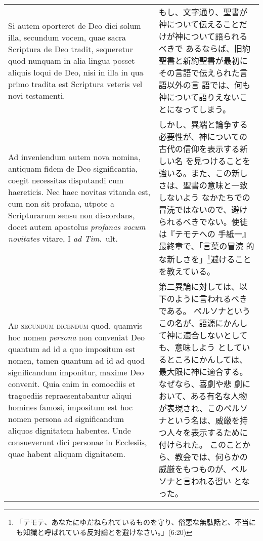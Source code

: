 \documentclass[10pt]{jsarticle} %
\begin{document}
\begin{longtable}{p{21em}p{21em}}
\\


Si
autem oporteret de Deo dici solum illa, secundum vocem, quae sacra
Scriptura de Deo tradit, sequeretur quod nunquam in alia lingua posset
aliquis loqui de Deo, nisi in illa in qua primo tradita est Scriptura
veteris vel novi testamenti. 

&

もし、文字通り、聖書が神について伝えることだけが神について語られるべきで
 あるならば、旧約聖書と新約聖書が最初にその言語で伝えられた言語以外の言
 語では、何も神について語りえないことになってしまう。



\\


Ad inveniendum autem nova nomina, antiquam
fidem de Deo significantia, coegit necessitas disputandi cum
haereticis. Nec haec novitas vitanda est, cum non sit profana, utpote a
Scripturarum sensu non discordans, docet autem apostolus {\itshape profanas vocum
novitates} vitare, I {\itshape ad Tim}.~ult.


&

しかし、異端と論争する必要性が、神についての古代の信仰を表示する新しい名
 を見つけることを強いる。また、この新しさは、聖書の意味と一致しないよう
 なかたちでの冒涜ではないので、避けられるべきでない。使徒は『テモテへの
 手紙一』最終章で、「言葉の冒涜
 的な新しさを」\footnote{「テモテ、あなたにゆだねられているものを守り、俗悪な無駄話と、不当にも知識と呼ばれている反対論とを避けなさい。」(6:20)}避けることを教えている。



\\



{\scshape Ad secundum dicendum} quod, quamvis hoc nomen {\itshape persona} non conveniat Deo
quantum ad id a quo impositum est nomen, tamen quantum ad id ad quod
significandum imponitur, maxime Deo convenit. Quia enim in comoediis et
tragoediis repraesentabantur aliqui homines famosi, impositum est hoc
nomen persona ad significandum aliquos dignitatem habentes. 
Unde
consueverunt dici personae in Ecclesiis, quae habent aliquam
dignitatem.


&

第二異論に対しては、以下のように言われるべきである。
ペルソナというこの名が、語源にかんして神に適合しないとしても、意味しよう
 としているところにかんしては、最大限に神に適合する。なぜなら、喜劇や悲
 劇において、ある有名な人物が表現され、このペルソナという名は、威厳を持
 つ人々を表示するために付けられた。
このことから、教会では、何らかの威厳をもつものが、ペルソナと言われる習い
 となった。



\end{longtable}
\end{document}
